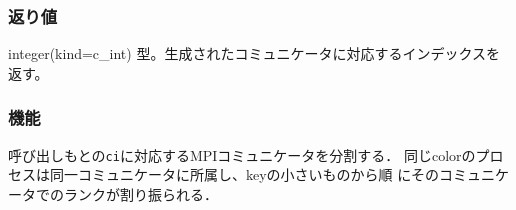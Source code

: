\subsubsection*{返り値}
integer(kind=c\_int) 型。生成されたコミュニケータに対応するインデックスを返す。


\subsubsection*{機能}
呼び出しもとの{\tt ci}に対応するMPIコミュニケータを分割する．
同じcolorのプロセスは同一コミュニケータに所属し、keyの小さいものから順
にそのコミュニケータでのランクが割り振られる．




\clearpage






